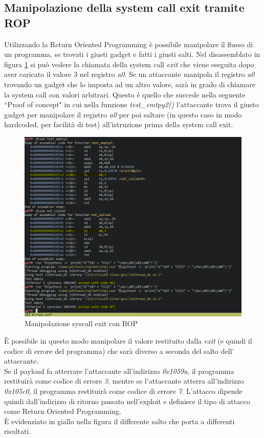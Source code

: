\subsection*{Manipolazione della system call exit tramite ROP}
Utilizzando la Return Oriented Programming è possibile manipolare il flusso di un programma, se trovati i giusti gadget e fatti i giusti salti. Nel disassemblato in figura \ref{ref:rop-exit-manipulation} si può vedere la chiamata della system call \textit{exit} che viene eseguita dopo aver caricato il valore 3 nel registro \textit{a0}. Se un attaccante manipola il registro \textit{a0} trovando un gadget che lo imposta ad un altro valore, sarà in grado di chiamare la system call con valori arbitrari. Questo è quello che succede nella seguente ``Proof of concept" in cui nella funzione \textit{test\_emtpy2()} l'attaccante trova il giusto gadget per manipolare il registro \textit{a0} per poi saltare (in questo caso in modo hardcoded, per facilità di test) all'istruzione prima della system call exit.
\vspace{1cm}
\FloatBarrier
\begin{figure}[!htbp]
    \centering
    \includegraphics[width=1\linewidth]{images/rop_exit.png}
    \caption{Manipolazione syscall exit con ROP}
    \label{ref:rop-exit-manipulation}
\end{figure}
\FloatBarrier
\vspace{1cm}
È possibile in questo modo manipolare il valore restituito dalla \textit{exit} (e quindi il codice di errore del programma) che sarà diverso a seconda del salto dell' attaccante.\\
Se il payload fa atterrare l'attaccante all'indirizzo \textit{0x1059a}, il programma restituirà come codice di errore \textit{3}, mentre se l'attaccante atterra all'indirizzo \textit{0x105c0}, il programma restituirà come codice di errore \textit{7}. L'attacco dipende quindi dall'indirizzo di ritorno passato nell'exploit e definisce il tipo di attacco come Return Oriented Programming.\\
È evidenziato in giallo nella figura il differente salto che porta a differenti risultati.

